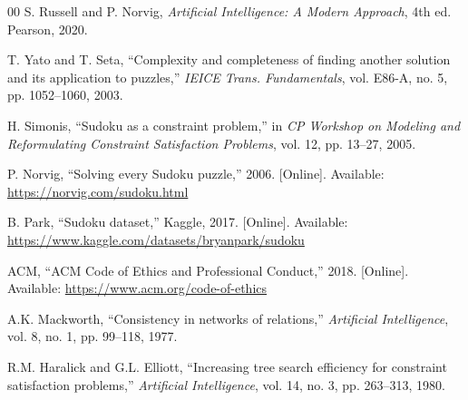 \documentclass[conference]{IEEEtran}
\begin{document}
\begin{thebibliography}{00}
 S. Russell and P. Norvig, \textit{Artificial Intelligence: A Modern Approach}, 4th ed. Pearson, 2020.

 T. Yato and T. Seta, ``Complexity and completeness of finding another solution and its application to puzzles,'' \textit{IEICE Trans. Fundamentals}, vol. E86-A, no. 5, pp. 1052--1060, 2003.

 H. Simonis, ``Sudoku as a constraint problem,'' in \textit{CP Workshop on Modeling and Reformulating Constraint Satisfaction Problems}, vol. 12, pp. 13--27, 2005.

 P. Norvig, ``Solving every Sudoku puzzle,'' 2006. [Online]. Available: \url{https://norvig.com/sudoku.html}

 B. Park, ``Sudoku dataset,'' Kaggle, 2017. [Online]. Available: \url{https://www.kaggle.com/datasets/bryanpark/sudoku}

 ACM, ``ACM Code of Ethics and Professional Conduct,'' 2018. [Online]. Available: \url{https://www.acm.org/code-of-ethics}

 A.K. Mackworth, ``Consistency in networks of relations,'' \textit{Artificial Intelligence}, vol. 8, no. 1, pp. 99--118, 1977.

 R.M. Haralick and G.L. Elliott, ``Increasing tree search efficiency for constraint satisfaction problems,'' \textit{Artificial Intelligence}, vol. 14, no. 3, pp. 263--313, 1980.

\end{thebibliography}
\end{document}
